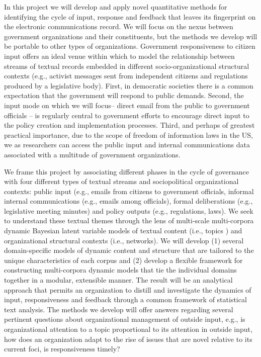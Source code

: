 In this project we will develop and apply novel quantitative methods for identifying the cycle of input, response and feedback that leaves its fingerprint on the electronic communications record. We will focus on the nexus between government organizations and their constituents, but the methods we develop will be portable to other types of organizations. Government responsiveness to citizen input offers an ideal venue within which to model the relationship between streams of textual records embedded in different socio-organizational structural contexts (e.g., activist messages sent from independent citizens and regulations produced by a legislative body).  First, in democratic societies there is a common expectation that the government will respond to public demands. Second, the input mode on which we will focus-- direct email from the public to government officials -- is regularly central to government efforts to encourage direct input to the policy creation and implementation processes. Third, and perhaps of greatest practical importance, due to the scope of freedom of information laws in the US, we as researchers can access the public input and internal communications data associated with a multitude of government organizations.




We frame this project by associating different phases in the cycle of governance with four different types of textual streams and sociopolitical organizational contexts: public input (e.g., emails from citizens to government officials, informal internal communications (e.g., emails among officials), formal deliberations (e.g., legislative meeting minutes) and policy outputs (e.g., regulations, laws). We seek to understand these textual themes through the lens of multi-scale multi-corpora dynamic Bayesian latent variable models of textual content (i.e., topics \cite{Blei2003}) and organizational structural contexts (i.e., networks). We will develop (1) several domain-specific models of dynamic content and structure that are tailored to the unique characteristics of each corpus and (2) develop a flexible framework for constructing multi-corpora dynamic models that tie the individual domains together in a modular, extensible manner. The result will be an analytical approach that permits an organization to distill and investigate the dynamics of input, responsiveness and feedback through a common framework of statistical text analysis.  The methods we develop will offer answers regarding several pertinent questions about organizational management of outside input, e.g., is organizational attention to a topic proportional to its attention in outside input, how does an organization adapt to the rise of issues that are novel relative to its current foci, is responsiveness timely? 

